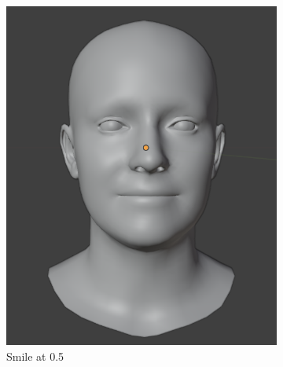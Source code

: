 \documentclass[../../main.tex]{subfiles}
\begin{document}
\begin{figure}[h]
\begin{subfigure}{0.3\linewidth}
      \includegraphics[width=\linewidth]{chapters/background_work/images/blendshapes_example/blendshapes_example_2.png} 
      \caption{Smile at 0.5} 
  \end{subfigure} 
  \hfill 
  \begin{subfigure}{0.3\linewidth} 

\end{subfigure}
\end{figure}
\end{document}

